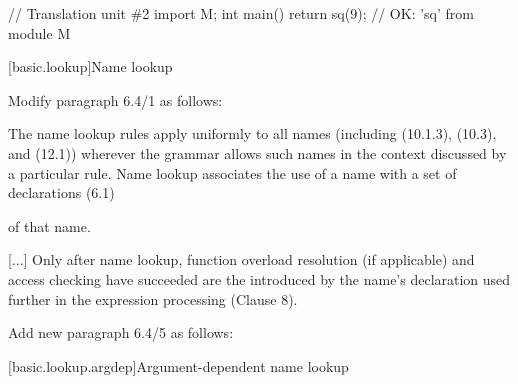 \begin{std.txt}
\begin{codeblock}
    // Translation unit \#2
    import M;
    int main() { return sq(9); }       // OK: 'sq' from module M
    \end{codeblock}
    \exitexample
\end{std.txt}


\setcounter{section}{3}
[basic.lookup]{Name lookup}

Modify paragraph 6.4/1 as follows:
\begin{std.txt}
  \resetalinea[0]
  \alinea
  The name lookup rules apply uniformly to all names
  (including  (10.1.3),
   (10.3), and 
   (12.1))
  wherever the grammar allows such names in the context discussed by a 
  particular rule.
  Name lookup associates the use of a name with a set of declarations (6.1)
\begin{undecided}
\end{undecided}
  of that name.
\begin{undecided}
\end{undecided}
  [...] Only after name lookup, function overload resolution (if applicable)
  and access checking have succeeded are the
   introduced by the name's
  declaration used further in the expression processing (Clause 8).
\end{std.txt}

\begin{before}
Add new paragraph 6.4/5 as follows:
\begin{std.txt}\color{addclr}
  \resetalinea[4]
  \alinea
\end{std.txt}
\end{before}

\setcounter{subsection}{1}
[basic.lookup.argdep]{Argument-dependent name lookup}

